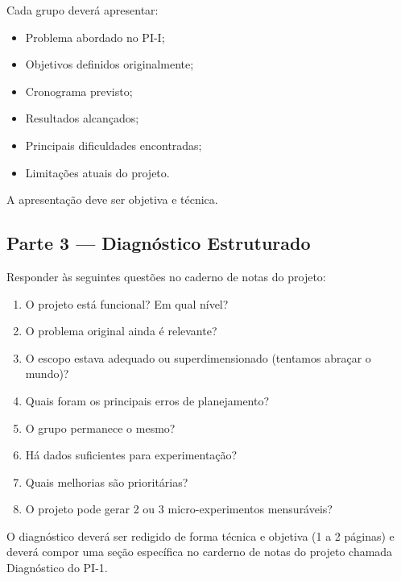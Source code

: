 \begin{boxAtividade}

Cada grupo deverá apresentar:

\begin{itemize}
\item Problema abordado no PI-I;
\item Objetivos definidos originalmente;
\item Cronograma previsto;
\item Resultados alcançados;
\item Principais dificuldades encontradas;
\item Limitações atuais do projeto.
\end{itemize}

A apresentação deve ser objetiva e técnica.

\end{boxAtividade}


\subsection{Parte 3 — Diagnóstico Estruturado}

\begin{boxAtividade}

Responder às seguintes questões no caderno de notas do projeto:

\begin{enumerate}
\item O projeto está funcional? Em qual nível?
\item O problema original ainda é relevante?
\item O escopo estava adequado ou superdimensionado (tentamos abraçar o mundo)?
\item Quais foram os principais erros de planejamento?
\item O grupo permanece o mesmo?
\item Há dados suficientes para experimentação?
\item Quais melhorias são prioritárias?
\item O projeto pode gerar 2 ou 3 micro-experimentos mensuráveis?
\end{enumerate}

O diagnóstico deverá ser redigido de forma técnica e objetiva (1 a 2 páginas) e deverá compor uma seção específica no carderno de notas do projeto chamada Diagnóstico do PI-1.

\end{boxAtividade}


